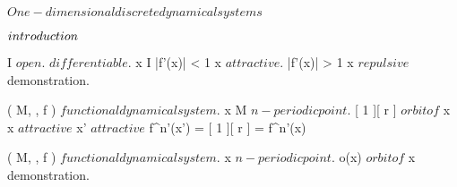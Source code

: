\documentclass[../Main/main]{subfiles}
\begin{document}
\unit{ $ One-dimensional discrete dynamical systems $ }
{
	\introduction
	{ 
		$introduction\\$ 
	}

	{
		{
			I \subset \R $ open $.
			 $ differentiable $.
			x \in I
		}
		\holds
		{
			|f'(x)| < 1 \imp x $ attractive $.
			|f'(x)| > 1 \imp x $ repulsive $
		}
		\demonstration
		{
			demonstration.
		}
	}
	
	
	{
		{
			( M, \N, f ) $ functional dynamical system $.
			x \in M $ n-periodic point $.
			[ 1 ][ r ] $ orbit of $ x
		}
		\holds
		{
			x $ attractive $ \ifandonlyif {}
			{
				x' $ attractive $
			}
		}
		\demonstration
		{
			{
				f^n'(x') = [ 1 ][ r ] = f^n'(x)
			}
		}
	}


	{
		{
			( M, \N, f ) $ functional dynamical system $.
			x $ n-periodic point $.
			o(x) $ orbit of $ x
		}
		\holds
		{
			{
			}
		}
		\demonstration
		{
			demonstration.
		}
	}
	
	
	
	
	
	

}
\end{document}

